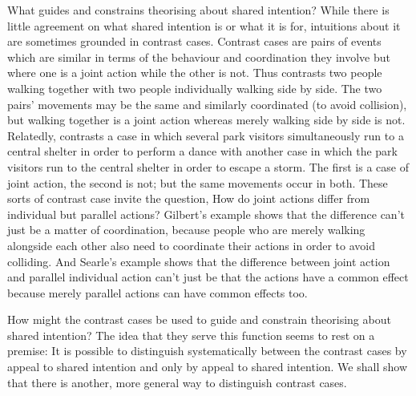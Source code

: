 \documentclass[12pt,\papersize]{extarticle}
\begin{document}
What guides and constrains theorising about shared intention? 
While there is little agreement on what shared intention is or what it is for, intuitions about it are sometimes grounded in contrast cases.
Contrast cases are pairs of events which are similar in terms of the behaviour and coordination they involve but where one is a joint action while the other is not.  
Thus \citet{gilbert_walking_1990} contrasts two people walking together with two people individually walking side by side.  
The two pairs' movements may be the same and similarly coordinated (to avoid collision), but walking together is a joint action whereas merely walking side by side is not. 
Relatedly,  \citet{Searle:1990em}  contrasts a case in which several park visitors simultaneously run to a central shelter in order to perform a dance with another case in which the park visitors run to the central shelter in order to escape a storm.  The first is a case of joint action, the second is not; but the same movements occur in both.  
These sorts of contrast case invite the question, 
How do joint actions differ from individual but parallel actions? 
Gilbert’s example shows that the difference can’t just be a matter of coordination, because people who are merely walking alongside each other also need to coordinate their actions in order to avoid colliding.  
And Searle’s example shows that the difference between joint action and parallel individual action can’t just be that the actions have a common effect because merely parallel actions can have common effects too. 

How might the contrast cases be used to guide and constrain theorising about shared intention?
The idea that they serve this function seems to rest on a premise:
It is possible to distinguish systematically between the contrast cases by appeal to shared intention and only by appeal to shared intention.
We shall show that there is another, more general way to distinguish contrast cases.
\end{document}
